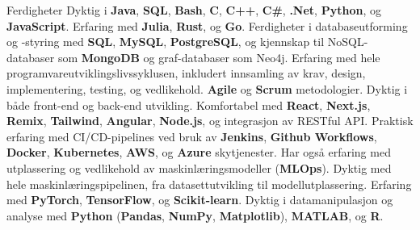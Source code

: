 \begin{rubric}{Ferdigheter}
\entry*[Programmeringsspråk]
    Dyktig i \textbf{Java}, \textbf{SQL}, \textbf{Bash}, \textbf{C}, \textbf{C++}, \textbf{C\#}, \textbf{.Net}, \textbf{Python}, og \textbf{JavaScript}. Erfaring med \textbf{Julia}, \textbf{Rust}, og \textbf{Go}.
    Ferdigheter i databaseutforming og -styring med \textbf{SQL}, \textbf{MySQL}, \textbf{PostgreSQL}, og kjennskap til NoSQL-databaser som \textbf{MongoDB} og graf-databaser som Neo4j.
    Erfaring med hele programvareutviklingslivssyklusen, inkludert innsamling av krav, design, implementering, testing, og vedlikehold. \textbf{Agile} og \textbf{Scrum} metodologier.
\entry*[Webutvikling]
    Dyktig i både front-end og back-end utvikling. Komfortabel med \textbf{React}, \textbf{Next.js}, \textbf{Remix}, \textbf{Tailwind}, \textbf{Angular}, \textbf{Node.js}, og integrasjon av RESTful API.
    Praktisk erfaring med CI/CD-pipelines ved bruk av \textbf{Jenkins}, \textbf{Github Workflows}, \textbf{Docker}, \textbf{Kubernetes}, \textbf{AWS}, og \textbf{Azure} skytjenester. Har også erfaring med utplassering og vedlikehold av maskinlæringsmodeller (\textbf{MLOps}).
\entry*[Maskinlæring]
    Dyktig med hele maskinlæringspipelinen, fra datasettutvikling til modellutplassering. Erfaring med \textbf{PyTorch}, \textbf{TensorFlow}, og \textbf{Scikit-learn}.
\entry*[Dataanalyse]
    Dyktig i datamanipulasjon og analyse med \textbf{Python} (\textbf{Pandas}, \textbf{NumPy}, \textbf{Matplotlib}), \textbf{MATLAB}, og \textbf{R}.
\end{rubric}
